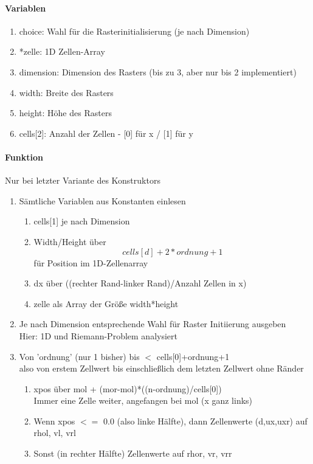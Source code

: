 \documentclass[12pt]{article}
\begin{document}
\paragraph{Variablen}
\begin{enumerate}
	\item choice: Wahl für die Rasterinitialisierung (je nach Dimension)
	\item *zelle: 1D Zellen-Array
	\item dimension: Dimension des Rasters (bis zu 3, aber nur bis 2 implementiert)
	\item width: Breite des Rasters
	\item height: Höhe des Rasters
	\item cells[2]: Anzahl der Zellen - [0] für x / [1] für y
\end{enumerate}

\renewcommand{\labelenumi}{\theenumi.} 
\paragraph{Funktion}
Nur bei letzter Variante des Konstruktors
\begin{enumerate}
	\item Sämtliche Variablen aus Konstanten einlesen
	\begin{enumerate}
		\item cells[1] je nach Dimension
		\item Width/Height über \[cells[d]+2*ordnung+1 \] für Position im 1D-Zellenarray
		\item dx über ((rechter Rand-linker Rand)/Anzahl Zellen in x)
		\item zelle als Array der Größe width*height
	\end{enumerate}
	\item Je nach Dimension entsprechende Wahl für Raster Initiierung ausgeben\\
	Hier: 1D und Riemann-Problem analysiert
	\item Von 'ordnung' (nur 1 bisher) bis $<$ cells[0]+ordnung+1\\
	also von erstem Zellwert bis einschließlich dem letzten Zellwert ohne Ränder
	\begin{enumerate}
		\item xpos über mol + (mor-mol)*((n-ordnung)/cells[0])\\
		Immer eine Zelle weiter, angefangen bei mol (x ganz links)
		\item Wenn xpos $<=$ 0.0 (also linke Hälfte), dann Zellenwerte (d,ux,uxr) auf rhol, vl, vrl
		\item Sonst (in rechter Hälfte) Zellenwerte auf rhor, vr, vrr
	\end{enumerate}
\end{enumerate}
\end{document}

